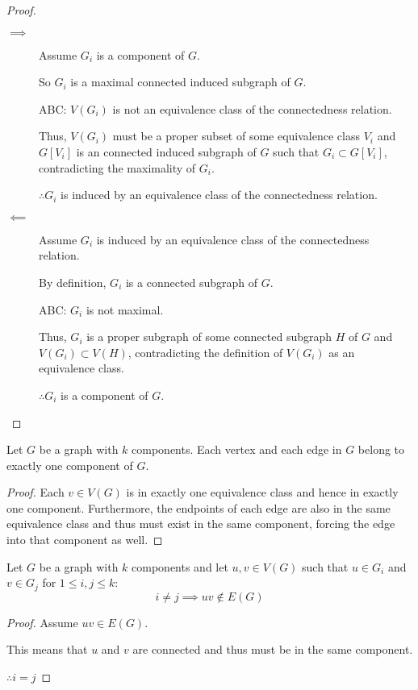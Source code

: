 \documentclass[letterpaper,12pt,fleqn]{article}
\begin{document}
\begin{proof}
  \begin{description}
  \item[]
  \item[\(\implies\)] Assume \(G_i\) is a component of \(G\).

    So \(G_i\) is a maximal connected induced subgraph of \(G\).

    ABC: \(V(G_i)\) is not an equivalence class of the connectedness relation.

    Thus, \(V(G_i)\) must be a proper subset of some equivalence class \(V_i\) and \(G[V_i]\) is an connected
    induced subgraph of \(G\) such that \(G_i\subset G[V_i]\), contradicting the maximality of \(G_i\).

    \(\therefore G_i\) is induced by an equivalence class of the connectedness relation.

  \item[\(\impliedby\)] Assume \(G_i\) is induced by an equivalence class of the connectedness
    relation.

    By definition, \(G_i\) is a connected subgraph of \(G\).

    ABC: \(G_i\) is not maximal.

    Thus, \(G_i\) is a proper subgraph of some connected subgraph \(H\) of \(G\) and \(V(G_i)\subset V(H)\),
    contradicting the definition of \(V(G_i)\) as an equivalence class.

    \(\therefore G_i\) is a component of \(G\).
  \end{description}
\end{proof}

\begin{corollary}
  Let \(G\) be a graph with \(k\) components.  Each vertex and each edge in \(G\) belong to exactly one component
  of \(G\).
\end{corollary}

\begin{proof}
  Each \(v\in V(G)\) is in exactly one equivalence class and hence in exactly one component.  Furthermore, the
  endpoints of each edge are also in the same equivalence class and thus must exist in the same component, forcing
  the edge into that component as well.
\end{proof}

\begin{corollary}
  Let \(G\) be a graph with \(k\) components and let \(u,v\in V(G)\) such that \(u\in G_i\) and \(v\in G_j\) for
  \(1\le i,j\le k\):
  \[i\ne j\implies uv\notin E(G)\]
\end{corollary}

\begin{proof}
  Assume \(uv\in E(G)\).

  This means that \(u\) and \(v\) are connected and thus must be in the same component.

  \(\therefore i=j\)
\end{proof}
\end{document}
